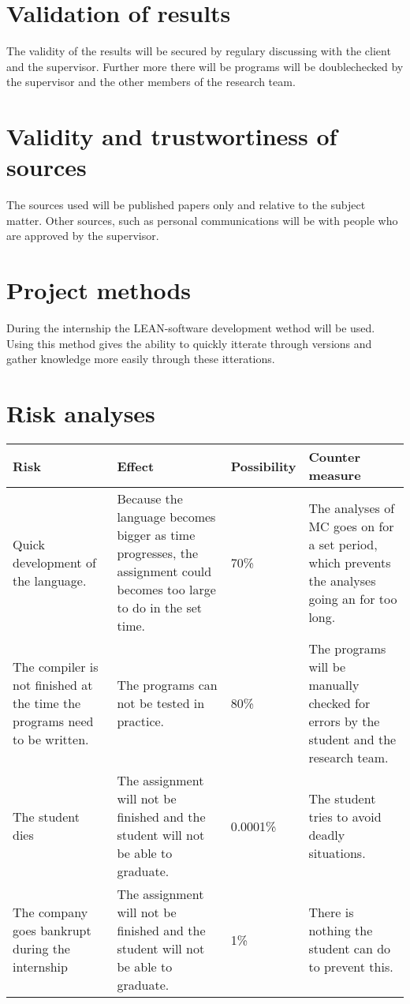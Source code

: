 \section{Validation of results}
The validity of the results will be secured by regulary discussing with the client and the supervisor.
Further more there will be programs will be doublechecked by the supervisor and the other members of the research team.

\section{Validity and trustwortiness of sources}
The sources used will be published papers only and relative to the subject matter.
Other sources, such as personal communications will be with people who are approved by the supervisor.

\section{Project methods}
During the internship the LEAN-software development wethod will be used\cite{ries2011lean}.
Using this method gives the ability to quickly itterate through versions and gather knowledge more easily through these itterations.

\section{Risk analyses}
\begin{center}
   \begin{tabular}
      {| p{} | p{} | l | p{} |}
      \hline
      \textbf{Risk} & \textbf{Effect} & \textbf{Possibility} & \textbf{Counter measure}
      \\ \hline
      Quick development of the language. & Because the language becomes bigger as time progresses, the assignment could becomes too large to do in the set time. & 70\% & The analyses of MC goes on for a set period, which prevents the analyses going an for too long.
      \\ \hline
      The compiler is not finished at the time the programs need to be written. & The programs can not be tested in practice. & 80\% & The programs will be manually checked for errors by the student and the research team.
      \\ \hline
      The student dies & The assignment will not be finished and the student will not be able to graduate. & 0.0001\% & The student tries to avoid deadly situations.
      \\ \hline
      The company goes bankrupt during the internship & The assignment will not be finished and the student will not be able to graduate. & 1\% & There is nothing the student can do to prevent this.
      \\ \hline
   \end{tabular}
\end{center}

